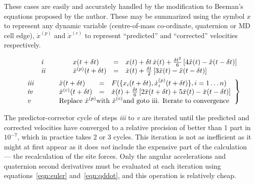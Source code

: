 \documentclass[twoside]{report}
\begin{document}
These cases are easily and accurately handled by the modification to
Beeman's equations proposed by the author\cite{refson:85}.  These may
be summarized using the symbol $x$ to represent any dynamic variable
(centre-of-mass co-ordinate, quaternion or MD cell edge),
$\dot{x}^{(p)}$ and $\dot{x}^{(c)}$ to represent ``predicted'' and
``corrected'' velocities respectively.

\newlength{\myboxw}
\addtolength{\myboxw}{\textwidth}
\addtolength{\myboxw}{-15pt}
\begin{minipage}{\myboxw}
\begin{eqnarray}
& &
\begin{array}{llll}
\makebox[0.5in][l]{\em i} & x(t+\delta t) &=& x(t) + \delta t \, \dot{x}(t) + 
\frac{\delta t^2}{6} 
\left [ 4 \ddot{x}(t) - \ddot{x}(t-\delta t) \right ] \\
\makebox[0.5in][l]{\em ii}  & \dot{x}^{(p)}(t+\delta t) & = & \dot{x}(t) + 
\frac{\delta t}{2} \left [ 3 \ddot{x}(t)- \ddot{x}(t-\delta t) \right ]
\end{array} \nonumber \\
& &
\left .
\begin{array}{llll}
\makebox[0.5in][l]{\em iii}  & \ddot{x}(t+\delta t) & = & F(\{ x_i(t+\delta t),
\dot{x}_i^{(p)}(t+\delta t)\}, i =  1\ldots n) \\
\makebox[0.5in][l]{\em iv} & \dot{x}^{(c)}(t+\delta t) & = & \dot{x}(t) + \frac{\delta t}{6} 
\left [ 2 \ddot{x}(t+\delta t) + 5 \ddot{x}(t)- \ddot{x}(t-\delta t) \right ]\\
\makebox[0.5in][l]{\em v} & 
\lefteqn{\mbox{Replace } \dot{x}^{(p)} \mbox{with }
\dot{x}^{(c)} \mbox{and goto iii.  Iterate to convergence}}
\end{array} 
\right \}
\end{eqnarray}
\end{minipage}
\vspace{10pt}

The predictor-corrector cycle of steps {\em iii\/} to {\em v\/} are
iterated until the predicted and corrected velocities have converged
to a relative precision of better than 1 part in $10^{-7}$, which in
practice takes 2 or 3 cycles.  This iteration is not as inefficient as
it might at first appear as it does {\em not\/} include the expensive
part of the calculation --- the recalculation of the site forces.
Only the angular accelerations and quaternion second derivatives must
be evaluated at each iteration using equations~\ref{eqn:euler} 
and~\ref{eqn:qddot}, and this operation is relatively cheap.
\end{document}
